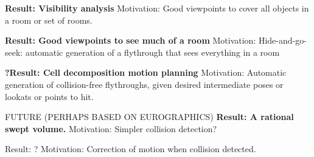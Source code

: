 \documentclass[12pt]{article}
\begin{document}
{\bf Result: Visibility analysis}
Motivation: Good viewpoints to cover all objects in a room or set of rooms.

{\bf Result: Good viewpoints to see much of a room}
Motivation: Hide-and-go-seek: automatic generation of a flythrough that sees everything in a room

{\bf ?Result: Cell decomposition motion planning}
Motivation: Automatic generation of collision-free flythroughs, given desired intermediate poses or lookats or points to hit.

FUTURE (PERHAPS BASED ON EUROGRAPHICS)
{\bf Result: A rational swept volume.}
Motivation: Simpler collision detection?

Result: ?
Motivation: Correction of motion when collision detected.

\clearpage
\end{document}
